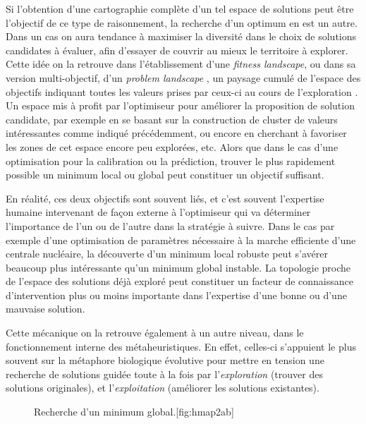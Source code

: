 Si l'obtention d'une cartographie complète d'un tel espace de solutions peut être l'objectif de ce type de raisonnement, la recherche d'un optimum en est un autre. Dans un cas on aura tendance à maximiser la diversité dans le choix de solutions candidates à évaluer, afin d'essayer de couvrir au mieux le territoire à explorer. Cette idée on la retrouve dans l'établissement d'une \textit{fitness landscape}, ou dans sa version multi-objectif, d'un \textit{problem landscape} \autocite[93-94]{Weise2011}, un paysage cumulé de l'espace des objectifs indiquant toutes les valeurs prises par ceux-ci au cours de l'exploration . Un espace mis à profit par l'optimiseur pour améliorer la proposition de solution candidate, par exemple en se basant sur la construction de cluster de valeurs intéressantes comme indiqué précédemment, ou encore en cherchant à favoriser les zones de cet espace encore peu explorées, etc. Alors que dans le cas d'une optimisation pour la calibration ou la prédiction, trouver le plus rapidement possible un minimum local ou global peut constituer un objectif suffisant.

En réalité, ces deux objectifs sont souvent liés, et c'est souvent l'expertise humaine intervenant de façon externe à l'optimiseur qui va déterminer l'importance de l'un ou de l'autre dans la stratégie à suivre. Dans le cas par exemple d'une optimisation de paramètres nécessaire à la marche efficiente d'une centrale nucléaire, la découverte d'un minimum local robuste peut s'avérer beaucoup plus intéressante qu'un minimum global instable. La topologie proche de l'espace des solutions déjà exploré peut constituer un facteur de connaissance d'intervention plus ou moins importante dans l'expertise d'une bonne ou d'une mauvaise solution.

Cette mécanique on la retrouve également à un autre niveau, dans le fonctionnement interne des métaheuristiques. En effet, celles-ci s'appuient le plus souvent sur la métaphore biologique évolutive pour mettre en tension une recherche de solutions guidée toute à la fois par l'\textit{exploration} (trouver des solutions originales), et l'\textit{exploitation} (améliorer les solutions existantes).

\begin{figure}[!htbp]
\begin{sidecaption}[fortoc]{Recherche d'un minimum global.}[fig:hmap2ab]
 \centering
 \qquad
\end{sidecaption}
\end{figure}

